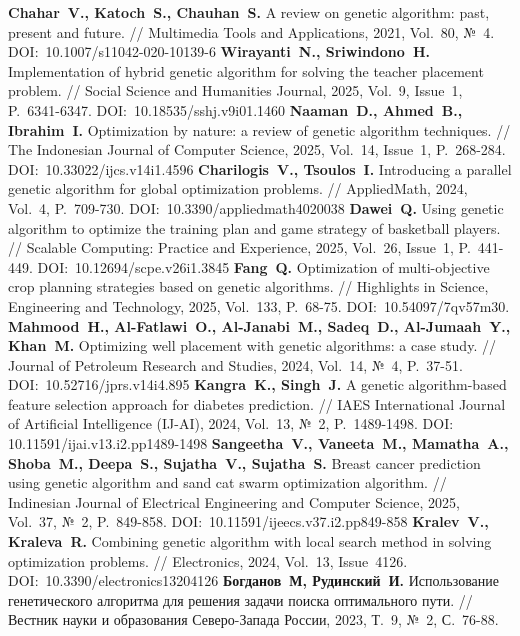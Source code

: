 \begin{thebibliography}{99}
\textbf{Chahar~V., Katoch~S., Chauhan~S.} A review on genetic algorithm: past, present and future. // Multimedia Tools and Applications, 2021, Vol.~80, №~4. DOI:~10.1007/s11042-020-10139-6
\textbf{Wirayanti~N., Sriwindono~H.} Implementation of hybrid genetic algorithm for solving the teacher placement problem. // Social Science and Humanities Journal, 2025, Vol.~9, Issue~1, P.~6341-6347. DOI:~10.18535/sshj.v9i01.1460
\textbf{Naaman~D., Ahmed~B., Ibrahim~I.} Optimization by nature: a review of genetic algorithm techniques. // The Indonesian Journal of Computer Science, 2025, Vol.~14, Issue~1, P.~268-284. DOI:~10.33022/ijcs.v14i1.4596
\textbf{Charilogis~V., Tsoulos~I.} Introducing a parallel genetic algorithm for global optimization problems. // AppliedMath, 2024, Vol.~4, P.~709-730. DOI:~10.3390/appliedmath4020038
\textbf{Dawei~Q.} Using genetic algorithm to optimize the training plan and game strategy of basketball players. // Scalable Computing: Practice and Experience, 2025, Vol.~26, Issue~1, P.~441-449. DOI:~10.12694/scpe.v26i1.3845
\textbf{Fang~Q.} Optimization of multi-objective crop planning strategies based on genetic algorithms. // Highlights in Science, Engineering and Technology, 2025, Vol.~133, P.~68-75. DOI:~10.54097/7qv57m30.
\textbf{Mahmood~H., Al-Fatlawi~O., Al-Janabi~M., Sadeq~D., Al-Jumaah~Y., Khan~M.} Optimizing well placement with genetic algorithms: a case study. // Journal of Petroleum Research and Studies, 2024, Vol.~14, №~4, P.~37-51. DOI:~10.52716/jprs.v14i4.895
\textbf{Kangra~K., Singh~J.} A genetic algorithm-based feature selection approach for diabetes prediction. // IAES International Journal of Artificial Intelligence (IJ-AI), 2024, Vol.~13, №~2, P.~1489-1498. DOI: 10.11591/ijai.v13.i2.pp1489-1498
\textbf{Sangeetha~V., Vaneeta~M., Mamatha~A., Shoba~M., Deepa~S., Sujatha~V., Sujatha~S.} Breast cancer prediction using genetic algorithm and sand cat swarm optimization algorithm. // Indinesian Journal of Electrical Engineering and Computer Science, 2025, Vol.~37, №~2, P.~849-858. DOI:~10.11591/ijeecs.v37.i2.pp849-858
\textbf{Kralev~V., Kraleva~R.} Combining genetic algorithm with local search method in solving optimization problems. // Electronics, 2024, Vol.~13, Issue~4126. DOI:~10.3390/electronics13204126
\textbf{Богданов~М, Рудинский~И.} Использование генетического алгоритма для решения задачи поиска оптимального пути. // Вестник науки и образования Северо-Запада России, 2023, Т.~9, №~2, С.~76-88.

\end{thebibliography}
